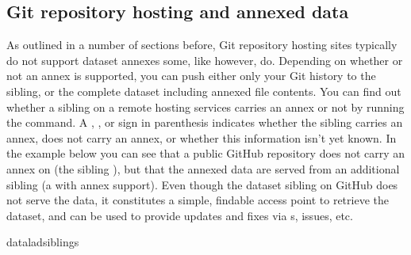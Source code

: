 \subsection{Git repository hosting and annexed data}
\label{\detokenize{basics/101-139-hostingservices:git-repository-hosting-and-annexed-data}}
\sphinxAtStartPar
As outlined in a number of sections before, Git repository hosting sites typically do not support dataset annexes \sphinxhyphen{} some, like {\hyperref[\detokenize{glossary:term-GIN}]{}} however, do.
Depending on whether or not an annex is supported, you can push either only your Git history to the sibling, or the complete dataset including annexed file contents.
You can find out whether a sibling on a remote hosting services carries an annex or not by running the  command.
A \sphinxcode{\sphinxupquote{+}}, \sphinxcode{\sphinxupquote{\sphinxhyphen{}}}, or  sign in parenthesis indicates whether the sibling carries an annex, does not carry an annex, or whether this information isn’t yet known.
In the example below you can see that a public GitHub repository  does not carry an annex on  (the sibling ), but that the annexed data are served from an additional sibling  (a {\hyperref[\detokenize{glossary:term-special-remote}]{}} with annex support).
Even though the dataset sibling on GitHub does not serve the data, it constitutes a simple, findable access point to retrieve the dataset, and can be used to provide updates and fixes via {\hyperref[\detokenize{glossary:term-pull-request}]{}}s, issues, etc.

\begin{sphinxVerbatim}[commandchars=\\\{\}]
dataladsiblings
\end{sphinxVerbatim}

